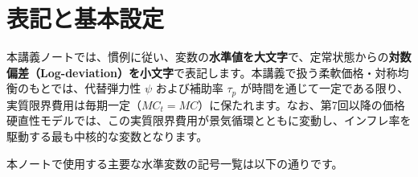 \documentclass[
  japanese,
  lualatex,
  ja=standard,
  12pt,
  a4paper]{ltjsarticle}
\begin{document}
\Needspace{0.18\textheight}

\section{表記と基本設定}\label{ux8868ux8a18ux3068ux57faux672cux8a2dux5b9a}

本講義ノートでは、慣例に従い、変数の\textbf{水準値を大文字}で、定常状態からの\textbf{対数偏差（Log-deviation）を小文字}で表記します。本講義で扱う柔軟価格・対称均衡のもとでは、代替弾力性
\(\psi\) および補助率 \(\tau_p\)
が時間を通じて一定である限り、実質限界費用は毎期一定（\(MC_t = MC\)）に保たれます。なお、第7回以降の価格硬直性モデルでは、この実質限界費用が景気循環とともに変動し、インフレ率を駆動する最も中核的な変数となります。

本ノートで使用する主要な水準変数の記号一覧は以下の通りです。
\end{document}
